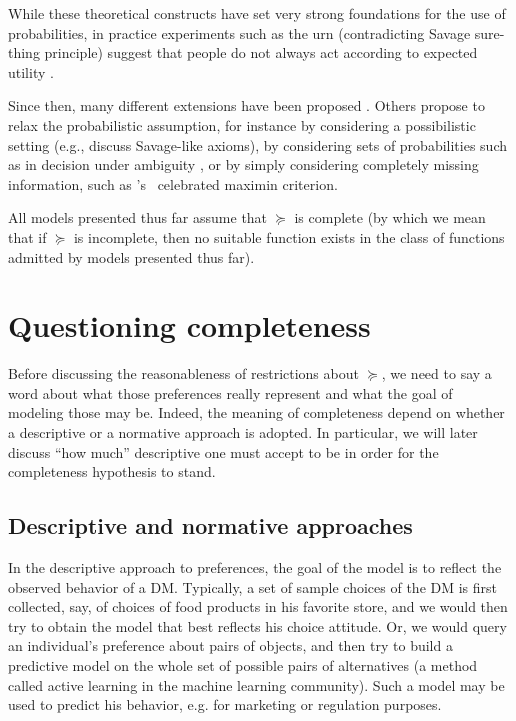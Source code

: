 \documentclass[version=last, pagesize, twocolumn, twoside=off, bibliography=totoc, 12pt, a4paper, english]{scrartcl}
\begin{document}
While these theoretical constructs have set very strong foundations for the use of probabilities, in practice experiments such as the \citet{ellsberg_risk_1961} urn (contradicting Savage sure-thing principle) suggest that people do not always act according to expected utility \citep{maccrimmon_utility_1979}. 
	
Since then, many different extensions have been proposed \citep{wakker_prospect_2010, quiggin_generalized_2012}. Others propose to relax the probabilistic assumption, for instance by considering a possibilistic setting  (e.g., \citet{dubois_qualitative_2003} discuss Savage-like axioms), by considering sets of probabilities such as in decision under ambiguity \citep{gajdos_attitude_2008}, or by simply considering completely missing information, such as \citeauthor{wald_statistical_1992}'s~\citeyearpar{wald_statistical_1992} celebrated maximin criterion. 
	
All models presented thus far assume that $\succeq$ is complete (by which we mean that if $\succeq$ is incomplete, then no suitable function exists in the class of functions admitted by models presented thus far).
	
\section{Questioning completeness}\label{sec:nordesc}
Before discussing the reasonableness of restrictions about $\succeq$, we need to say a word about what those preferences really represent and what the goal of modeling those may be. Indeed, the meaning of completeness depend on whether a descriptive or a normative approach is adopted. In particular, we will later discuss “how much” descriptive one must accept to be in order for the completeness hypothesis to stand.
	
\subsection{Descriptive and normative approaches}
In the descriptive approach to preferences, the goal of the model is to reflect the observed behavior of a \ac{DM}. Typically, a set of sample choices of the \ac{DM} is first collected, say, of choices of food products in his favorite store, and we would then try to obtain the model that best reflects his choice attitude. Or, we would query an individual’s preference about pairs of objects, and then try to build a predictive model on the whole set of possible pairs of alternatives (a method called active learning in the machine learning community). Such a model may be used to predict his behavior, e.g. for marketing or regulation purposes. 
\end{document}
